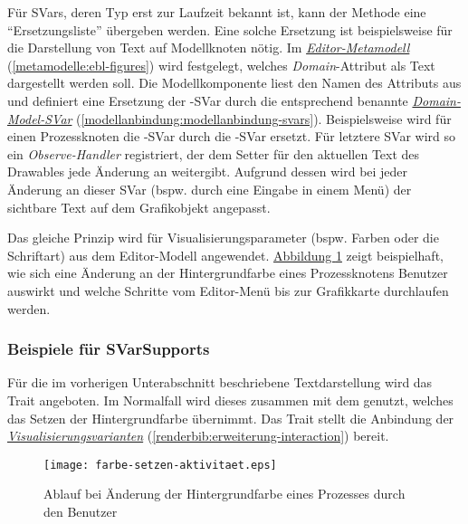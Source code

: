 \documentclass[a4paper,10pt]{sphinxmanual}
\begin{document}
Für SVars, deren Typ erst zur Laufzeit bekannt ist, kann der Methode eine "`Ersetzungsliste"' übergeben werden.
Eine solche Ersetzung ist beispielsweise für die Darstellung von Text auf Modellknoten nötig.
Im {\hyperref[metamodelle:ebl-figures]{\emph{Editor-Metamodell}}} (\autoref*{metamodelle:ebl-figures}) wird festgelegt, welches \emph{Domain}-Attribut als Text dargestellt werden soll.
Die Modellkomponente liest den Namen des Attributs aus und definiert eine Ersetzung der -SVar durch die entsprechend benannte {\hyperref[modellanbindung:modellanbindung-svars]{\emph{Domain-Model-SVar}}} (\autoref*{modellanbindung:modellanbindung-svars}).
Beispielsweise wird für einen Prozessknoten die -SVar durch die -SVar ersetzt.
Für letztere SVar wird so ein \emph{Observe-Handler} registriert, der dem Setter für den aktuellen Text des Drawables jede Änderung an  weitergibt.
Aufgrund dessen wird bei jeder Änderung an dieser SVar (bspw. durch eine Eingabe in einem Menü) der sichtbare Text auf dem Grafikobjekt angepasst.

Das gleiche Prinzip wird für Visualisierungsparameter (bspw. Farben oder die Schriftart) aus dem Editor-Modell angewendet.
\hyperref[renderbib:farbe-setzen-aktivitaet]{Abbildung  \ref*{renderbib:farbe-setzen-aktivitaet}} zeigt beispielhaft, wie sich eine Änderung an der Hintergrundfarbe eines Prozessknotens Benutzer auswirkt und welche Schritte vom Editor-Menü bis zur Grafikkarte durchlaufen werden.


\subsubsection{Beispiele für SVarSupports}
\label{renderbib:beispiele-fur-svarsupports}
Für die im vorherigen Unterabschnitt beschriebene Textdarstellung wird das Trait  angeboten.
Im Normalfall wird dieses zusammen mit dem  genutzt, welches das Setzen der Hintergrundfarbe übernimmt.
Das Trait  stellt die Anbindung der {\hyperref[renderbib:erweiterung-interaction]{\emph{Visualisierungsvarianten}}} (\autoref*{renderbib:erweiterung-interaction}) bereit.
\begin{figure}[htbp]
\centering
\capstart

\texttt{[image: farbe-setzen-aktivitaet.eps]}
\caption{Ablauf bei Änderung der Hintergrundfarbe eines Prozesses durch den Benutzer}\label{renderbib:farbe-setzen-aktivitaet}\end{figure}
\pagebreak
\end{document}
